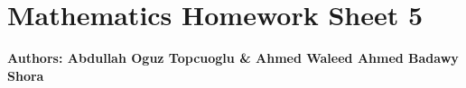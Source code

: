 \documentclass{article}
\begin{document}
\section*{\huge Mathematics Homework Sheet 5}
\begin{flushright}
   \textbf{Authors: Abdullah Oguz Topcuoglu \& Ahmed Waleed Ahmed Badawy Shora}
\end{flushright}

\end{document}

